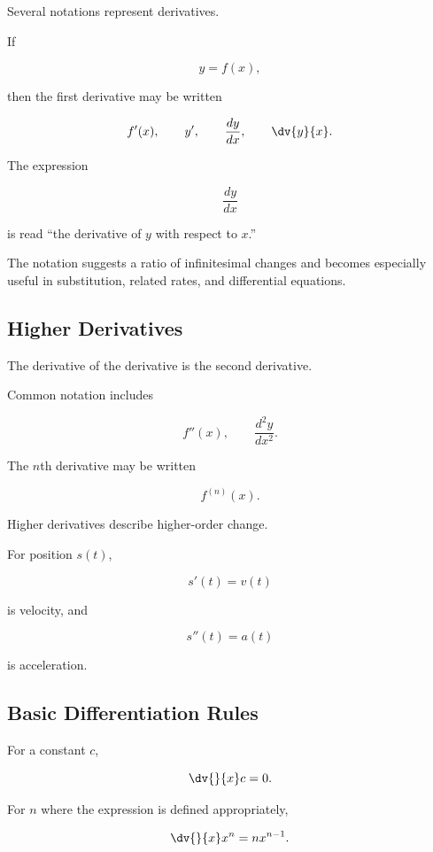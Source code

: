 Several notations represent derivatives.

If

\[ y=f(x), \]

then the first derivative may be written

\[ f'(x),\qquad y',\qquad \frac{dy}{dx},\qquad \dv{y}{x}. \]

The expression

\[ \frac{dy}{dx} \]

is read ``the derivative of \(y\) with respect to \(x\).''

The notation suggests a ratio of infinitesimal changes and becomes especially
useful in substitution, related rates, and differential equations.

\subsection{Higher Derivatives}
\label{subsec:higher-derivatives}

The derivative of the derivative is the second derivative.

Common notation includes

\[ f''(x),\qquad \frac{d^2y}{dx^2}. \]

The \(n\)th derivative may be written

\[ f^{(n)}(x). \]

Higher derivatives describe higher-order change.

For position \(s(t)\),

\[ s'(t)=v(t) \]

is velocity, and

\[ s''(t)=a(t) \]

is acceleration.

\subsection{Basic Differentiation Rules}
\label{subsec:basic-differentiation-rules}

For a constant \(c\),

\[ \dv{}{x}c=0. \]

For \(n\) where the expression is defined appropriately,

\[ \dv{}{x}x^n=nx^{n-1}. \]

